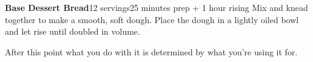 \documentclass[../Cookbook.tex]{subfiles}
\begin{document}
\begin{recipe}[BaseDessertBread]{\textbf{Base Dessert Bread}}{12 servings}{25 minutes prep + 1 hour rising}
	Mix and knead together to make a smooth, soft dough.
	Place the dough in a lightly oiled bowl and let rise until doubled in volume.
	
	After this point what you do with it is determined by what you're using it for.
\end{recipe}
\end{document}
